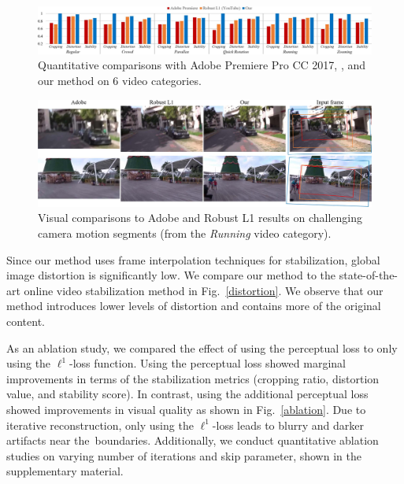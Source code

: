 \begin{figure}
	\includegraphics[width=1\linewidth,keepaspectratio]{us_quant}
	\vspace{-5mm}
	\caption{Quantitative comparisons with Adobe Premiere Pro CC 2017, \cite{grundmann2011auto}, and our method on 6 video categories.}
	\label{us_quant}
\end{figure}

\begin{figure}
	\includegraphics[width=1\linewidth,keepaspectratio]{us_qual}
	\vspace{-7mm}
	\caption{Visual comparisons to Adobe and Robust L1 results on challenging camera motion segments (from the \emph{Running} video category).}
	\label{us_qual}
\end{figure}

Since our method uses frame interpolation techniques for stabilization, global image distortion is significantly low.
We compare our method to the state-of-the-art online video stabilization method \cite{wang2018deep} in Fig.~\ref{distortion}.
We observe that our method introduces lower levels of distortion and contains more of the original content.

As an ablation study, we compared the effect of using the perceptual loss to only using the $\ell^1$-loss function.
Using the perceptual loss showed marginal improvements in terms of the stabilization metrics (cropping ratio, distortion value, and stability score).
In contrast, using the additional perceptual loss showed improvements in visual quality as shown in Fig.~\ref{ablation}.
Due to iterative reconstruction, only using the $\ell^1$-loss leads to blurry and darker artifacts near the~boundaries.
Additionally, we conduct quantitative ablation studies on varying number of iterations and skip parameter, shown in the supplementary material.

